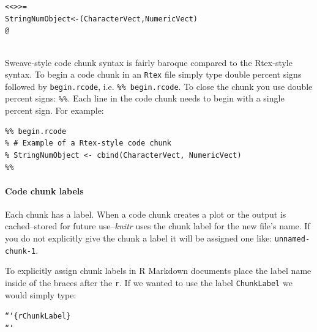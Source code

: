 \documentclass[krantz1]{krantz}
\begin{document}
\begin{knitrout}
    \color{fgcolor}\begin{kframe}
        \begin{alltt}
\textless\textless \textgreater\textgreater=
StringNumObject <- (CharacterVect, NumericVect)
@
        \end{alltt}
    \end{kframe}
\end{knitrout}

 \\[0.25cm]

Sweave-style code chunk syntax is fairly baroque compared to the Rtex-style syntax. To begin a code chunk in an \texttt{Rtex} file simply type double percent signs followed by \texttt{begin.rcode}, i.e. \texttt{\%\% begin.rcode}. To close the chunk you use double percent signs: \texttt{\%\%}. Each line in the code chunk needs to begin with a single percent sign. For example:

\begin{knitrout}
    \color{fgcolor}
    \begin{kframe}
        \begin{verbatim}
%% begin.rcode
% # Example of a Rtex-style code chunk
% StringNumObject <- cbind(CharacterVect, NumericVect)
%%
            \end{verbatim}
        \end{kframe}
\end{knitrout}

\paragraph{Code chunk labels}

Each chunk has a label. When a code chunk creates a plot or the output is cached--stored for future use--{\emph{knitr}} uses the chunk label for the new file's name. If you do not explicitly give the chunk a label it will be assigned one like: \texttt{unnamed-chunk-1}.

To explicitly assign chunk labels in R Markdown documents place the label name inside of the braces after the \texttt{r}. If we wanted to use the label \texttt{ChunkLabel} we would simply type:

\begin{knitrout}
\color{fgcolor}\begin{kframe}
\begin{alltt}
```\{r ChunkLabel\}
```
\end{alltt}
\end{kframe}
\end{knitrout}
\end{document}
